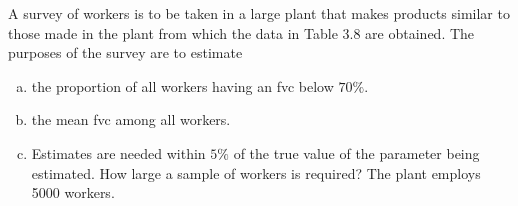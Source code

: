 \documentclass[12pt]{article}
\begin{document}
    \begin{exercise}[Levy-3.6]
        A survey of workers is to be taken in a large plant that makes products similar to those made in the plant from which the data in Table 3.8 are obtained. The purposes of the survey are to estimate 
        \begin{enumerate}[(a)]
            \item the proportion of all workers having an fvc below $70\%$. 
            \item the mean fvc among all workers. 
            \item Estimates are needed within $5\%$ of the true value of the parameter being estimated. How large a sample of workers is required? The plant employs 5000 workers.
        \end{enumerate}
    \end{exercise}
\end{document}
